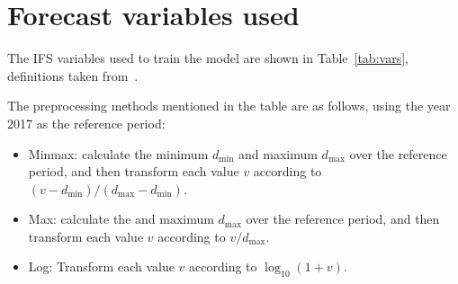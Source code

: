 \documentclass[../main.tex]{subfiles}
\begin{document}
\section{Forecast variables used}\label{app:fcst_vars}
The IFS variables used to train the model are shown in Table~\ref{tab:vars}, definitions taken from~\citep{ecmwf_parameter_2023}.

The preprocessing methods mentioned in the table are as follows, using the year 2017 as the reference period:
\begin{itemize}
    \item Minmax: calculate the minimum $d_{\text{min}}$ and maximum $d_{\text{max}}$ over the reference period, and then transform each value $v$ according to $(v - d_{\text{min}}) / (d_{\text{max}} - d_{\text{min}})$.
    \item Max: calculate the and maximum $d_{\text{max}}$ over the reference period, and then transform each value $v$ according to $v  / d_{\text{max}}$.
    \item Log: Transform each value $v$ according to $\log_{10}(1+v)$.
\end{itemize}
\end{document}
